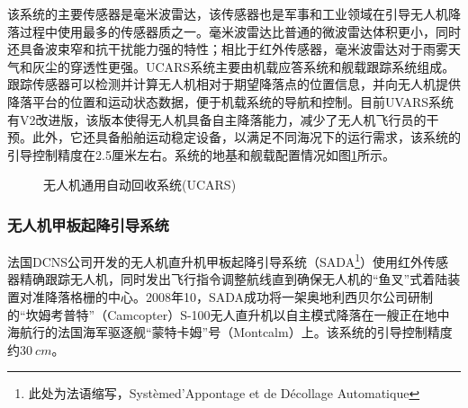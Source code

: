 该系统的主要传感器是毫米波雷达，该传感器也是军事和工业领域在引导无人机降落过程中使用最多的传感器质之一。毫米波雷达比普通的微波雷达体积更小，同时还具备波束窄和抗干扰能力强的特性；相比于红外传感器，毫米波雷达对于雨雾天气和灰尘的穿透性更强。UCARS系统主要由机载应答系统和舰载跟踪系统组成。跟踪传感器可以检测并计算无人机相对于期望降落点的位置信息，并向无人机提供降落平台的位置和运动状态数据，便于机载系统的导航和控制。目前UVARS系统有V2改进版，该版本使得无人机具备自主降落能力，减少了无人机飞行员的干预。此外，它还具备船舶运动稳定设备，以满足不同海况下的运行需求，该系统的引导控制精度在2.5厘米左右。系统的地基和舰载配置情况如图\ref{fig:29_UCARS}所示。 

\begin{figure}[htb]
	\centering%
	\hspace{1em}%
	\caption{无人机通用自动回收系统(UCARS)}
	\label{fig:29_UCARS}
\end{figure}

\subsubsection{无人机甲板起降引导系统}
法国DCNS公司开发的无人机直升机甲板起降引导系统（SADA\footnote{此处为法语缩写，Systèmed’Appontage et de Décollage Automatique}）\cite{DCNS}使用红外传感器精确跟踪无人机，同时发出飞行指令调整航线直到确保无人机的“鱼叉”式着陆装置对准降落格栅的中心。2008年10，SADA成功将一架奥地利西贝尔公司研制的“坎姆考普特”（Camcopter）S-100无人直升机以自主模式降落在一艘正在地中海航行的法国海军驱逐舰“蒙特卡姆”号（Montcalm）上。该系统的引导控制精度约$30\ cm$。

